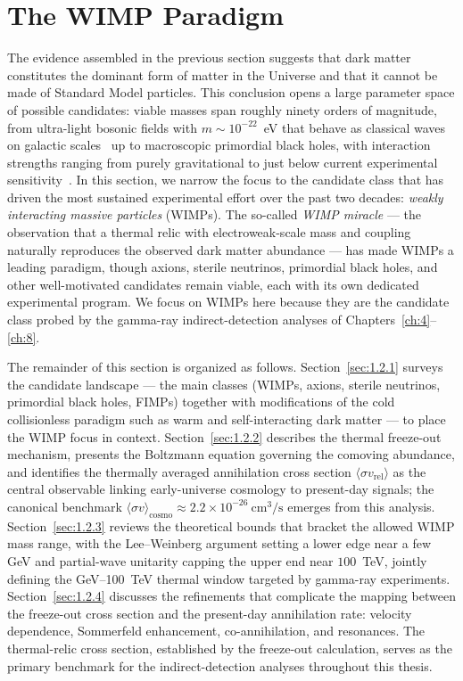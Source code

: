 
\section{The WIMP Paradigm}
\label{sec:1.2}

The evidence assembled in the previous section suggests that dark matter constitutes the dominant form of matter in the Universe and that it cannot be made of Standard Model particles.
This conclusion opens a large parameter space of possible candidates: viable masses span roughly ninety orders of magnitude, from ultra-light bosonic fields with $m \sim 10^{-22}$~eV that behave as classical waves on galactic scales~\cite{Hu:2000ke} up to macroscopic primordial black holes, with interaction strengths ranging from purely gravitational to just below current experimental sensitivity~\cite{Cirelli:2024ssz}.
In this section, we narrow the focus to the candidate class that has driven the most sustained experimental effort over the past two decades: \emph{weakly interacting massive particles} (WIMPs).
The so-called \emph{WIMP miracle} --- the observation that a thermal relic with electroweak-scale mass and coupling naturally reproduces the observed dark matter abundance --- has made WIMPs a leading paradigm, though axions, sterile neutrinos, primordial black holes, and other well-motivated candidates remain viable, each with its own dedicated experimental program.
We focus on WIMPs here because they are the candidate class probed by the gamma-ray indirect-detection analyses of Chapters~\ref{ch:4}--\ref{ch:8}.

The remainder of this section is organized as follows.
Section~\ref{sec:1.2.1} surveys the candidate landscape --- the main classes (WIMPs, axions, sterile neutrinos, primordial black holes, FIMPs) together with modifications of the cold collisionless paradigm such as warm and self-interacting dark matter --- to place the WIMP focus in context.
Section~\ref{sec:1.2.2} describes the thermal freeze-out mechanism, presents the Boltzmann equation governing the comoving abundance, and identifies the thermally averaged annihilation cross section $\langle\sigma v_\mathrm{rel}\rangle$ as the central observable linking early-universe cosmology to present-day signals; the canonical benchmark $\langle\sigma v\rangle_\mathrm{cosmo} \approx 2.2\times 10^{-26}~\mathrm{cm}^3/\mathrm{s}$ emerges from this analysis.
Section~\ref{sec:1.2.3} reviews the theoretical bounds that bracket the allowed WIMP mass range, with the Lee--Weinberg argument setting a lower edge near a few GeV and partial-wave unitarity capping the upper end near $100$~TeV, jointly defining the GeV--100~TeV thermal window targeted by gamma-ray experiments.
Section~\ref{sec:1.2.4} discusses the refinements that complicate the mapping between the freeze-out cross section and the present-day annihilation rate: velocity dependence, Sommerfeld enhancement, co-annihilation, and resonances.
The thermal-relic cross section, established by the freeze-out calculation, serves as the primary benchmark for the indirect-detection analyses throughout this thesis.

